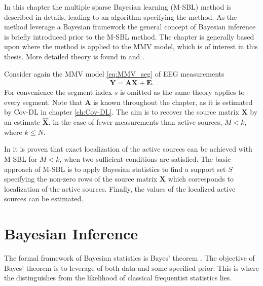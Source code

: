 In this chapter the multiple sparse Bayesian learning (M-SBL) method is described in details, leading to an algorithm specifying the method. As the method leverage a Bayesian framework the general concept of Bayesian inference is briefly introduced prior to the M-SBL method. The chapter is generally based upon \cite{Balkan2014} where the method is applied to the MMV model, which is of interest in this thesis. More detailed theory is found in \cite{phd_wipf} and \cite{article_wipf}.

Consider again the MMV model \eqref{eq:MMV_seg} of EEG measurements
\begin{align}
\mathbf{Y} = \mathbf{AX} + \mathbf{E}.\label{eq:MSBL_MMV}
\end{align}
For convenience the segment index $s$ is omitted as the same theory applies to every segment.  
Note that $\mathbf{A}$ is known throughout the chapter, as it is estimated by Cov-DL in chapter \ref{ch:Cov-DL}.
The aim is to recover the source matrix $\mathbf{X}$ by an estimate $\hat{\mathbf{X}}$, in the case of fewer measurements than active sources, $M < k$, where $k \leq N$. 

In \cite{Balkan2014} it is proven that exact localization of the active sources can be achieved with M-SBL for $M < k$, when two sufficient conditions are satisfied. 
The basic approach of M-SBL is to apply Bayesian statistics to find a support set $S$ specifying the non-zero rows of the source matrix $\mathbf{X}$ which corresponds to localization of the active sources. Finally, the values of the localized active sources can be estimated.

\section{Bayesian Inference} 
The formal framework of Bayesian statistics is Bayes' theorem \cite[p. 86]{Kay}. The objective of Bayes' theorem is to leverage of both data and some specified prior. This is where the distinguishes from the likelihood of classical frequentist statistics lies.     

